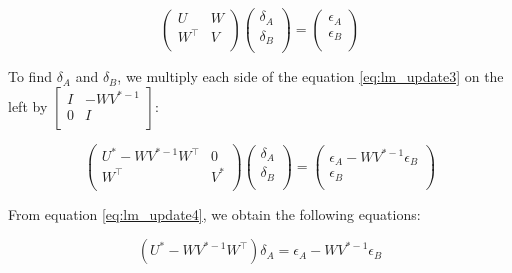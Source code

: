 \documentclass[11pt]{report}
\begin{document}
\begin{equation}
  \label{eq:lm_update3}
  \left (
    \begin{matrix}
        U & W \\
        W^\top & V \\
    \end{matrix}
  \right )
  \left (
  \begin{matrix}
    \delta_A \\
    \delta_B \\
  \end{matrix}
  \right )
  = 
  \left (
  \begin{matrix}
    \epsilon_A \\
    \epsilon_B \\
  \end{matrix}
  \right )
\end{equation}

To find $\delta_A$ and $\delta_B$, we multiply each side of the equation \ref{eq:lm_update3} on the left by $\left [ \begin{matrix} I & -WV^{\ast -1} \\ 0 & I \\ \end{matrix} \right ]$:

\begin{equation}
  \label{eq:lm_update4}
  \left (
    \begin{matrix}
        U^\ast - WV^{\ast -1}W^\top & 0 \\
        W^\top & V^\ast \\
    \end{matrix}
  \right )
  \left (
  \begin{matrix}
    \delta_A \\
    \delta_B \\
  \end{matrix}
  \right )
  = 
  \left (
  \begin{matrix}
    \epsilon_A - WV^{\ast -1}\epsilon_B \\
    \epsilon_B \\
  \end{matrix}
  \right )
\end{equation}

From equation \ref{eq:lm_update4}, we obtain the following equations:

\begin{equation}
  (U^\ast - WV^{\ast -1}W^\top)\delta_A = \epsilon_A - WV^{\ast -1}\epsilon_B
\end{equation} 
\end{document}
